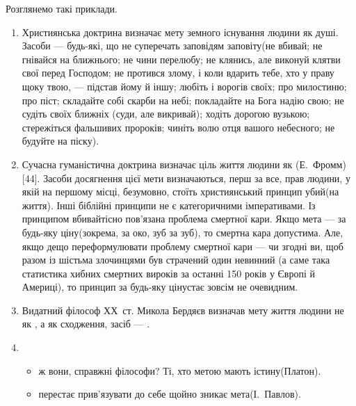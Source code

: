 \documentclass[a4paper, 12pt]{article}
\begin{document}
Розглянемо такі приклади.
\begin{enumerate}
	\item Християнська доктрина визначає мету земного існування людини як  душі\guillemotright. Засоби --- будь-які, що не суперечать заповідям  заповіту\guillemotright (не вбивай; не гнівайся на ближнього; не чини перелюбу; не клянись, але виконуй клятви свої перед Господом; не протився злому, і коли вдарить тебе, хто у праву щоку твою, --- підстав йому й іншу; любіть і ворогів своїх; про милостиню; про піст; складайте собі скарби на небі; покладайте на Бога надію свою; не судіть своїх ближніх ( суди, але викривай\guillemotright); ходіть дорогою вузькою; стережіться фальшивих пророків; чиніть волю отця вашого небесного; не будуйте на піску).

	\item Сучасна гуманістична доктрина визначає ціль життя людини як \guillemotright (Е.~Фромм) [44]. Засоби досягнення цієї мети визначаються, перш за все,  прав людини\guillemotright, у якій на першому місці, безумовно, стоїть християнський принцип  убий\guillemotright \allowbreak ( на життя\guillemotright). Інші біблійні принципи не є категоричними імперативами. Із принципом  вбивай\guillemotright тісно пов'язана проблема смертної кари. Якщо мета ---  за будь-яку ціну\guillemotright (зокрема,  за око, зуб за зуб\guillemotright), то смертна кара допустима. Але, якщо дещо переформулювати проблему смертної кари --- чи згодні ви, щоб разом із шістьма злочинцями був страчений один невинний (а саме така статистика хибних смертних вироків за останні 150 років у Європі й Америці), то принцип  за будь-яку ціну\guillemotright стає зовсім не очевидним.

	\item Видатний філософ ХХ~ст. Микола Бердяєв визначав мету життя людини не як \guillemotright, а як  сходження\guillemotright, засіб --- \guillemotright [13].

	\item
	\begin{itemize} 
		\item {} ж вони, справжні філософи? Ті, хто метою мають істину\guillemotright (Платон).

		\item {} перестає прив'язувати до себе щойно зникає мета\guillemotright (І.~Павлов).


\end{itemize}
\end{enumerate}
\end{document}
